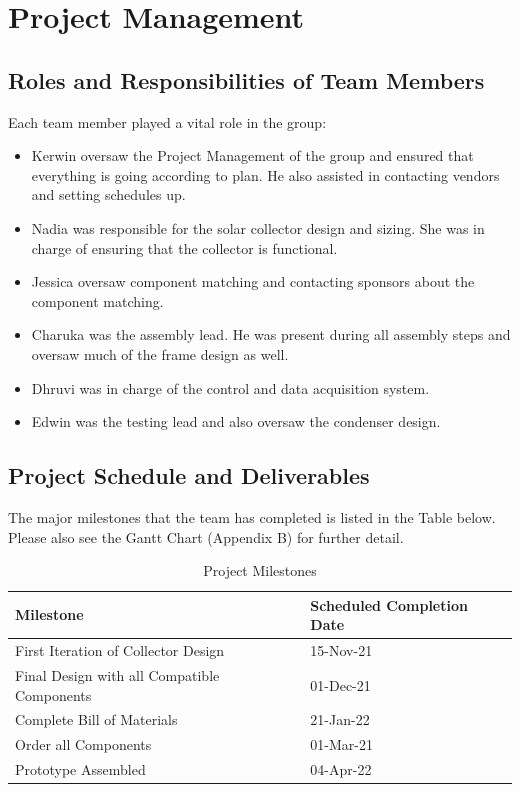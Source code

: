\chapter{Project Management}

\section{Roles and Responsibilities of Team Members}

Each team member played a vital role in the group:

\medskip
\begin{itemize}[itemsep=3mm, parsep=-1mm]
    \item Kerwin oversaw the Project Management of the group and ensured that everything is going according to plan. He also assisted in contacting vendors and setting schedules up. 
    \item Nadia was responsible for the solar collector design and sizing. She was in charge of ensuring that the collector is functional.
    \item Jessica oversaw component matching and contacting sponsors about the component matching. 
    \item Charuka was the assembly lead. He was present during all assembly steps and oversaw much of the frame design as well.
    \item Dhruvi was in charge of the control and data acquisition system. 
    \item Edwin was the testing lead and also oversaw the condenser design.
\end{itemize}

\section{Project Schedule and Deliverables}
The major milestones that the team has completed is listed in the Table below. Please also see the Gantt Chart (Appendix B) for further detail.
\begin{table}[H]
\centering
\caption{Project Milestones}
\begin{tabular}{|P{75mm}|P{75mm}|}
    \hline
    Milestone & Scheduled Completion Date \\
    \hline
    First Iteration of Collector Design         & 15-Nov-21 \\
    Final Design with all Compatible Components & 01-Dec-21  \\
    Complete Bill of Materials                  & 21-Jan-22 \\
    Order all Components                        & 01-Mar-21 \\
    Prototype Assembled                         & 04-Apr-22  \\
    \hline
\end{tabular}
\end{table}


